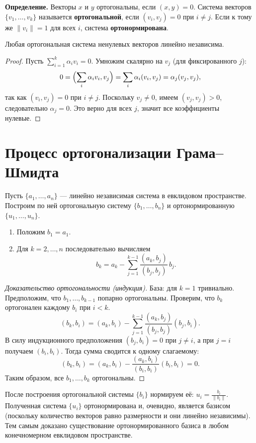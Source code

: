 \documentclass[10pt]{article}
\begin{document}
\textbf{Определение.} Векторы $x$ и $y$ ортогональны, если $(x,y)=0$. Система векторов $\{v_1,\dots,v_k\}$ называется \textbf{ортогональной}, если $(v_i, v_j)=0$ при $i\neq j$. Если к тому же $\|v_i\|=1$ для всех $i$, система \textbf{ортонормирована}.

\begin{theorem}
Любая ортогональная система ненулевых векторов линейно независима.
\end{theorem}
\begin{proof}
Пусть $\sum_{i=1}^k \alpha_i v_i = 0$. Умножим скалярно на $v_j$ (для фиксированного $j$):
\[
0 = \Bigl(\sum_i \alpha_i v_i, v_j\Bigr) = \sum_i \alpha_i (v_i, v_j) = \alpha_j (v_j, v_j),
\]
так как $(v_i, v_j)=0$ при $i\neq j$. Поскольку $v_j \neq 0$, имеем $(v_j, v_j)>0$, следовательно $\alpha_j = 0$. Это верно для всех $j$, значит все коэффициенты нулевые.
\end{proof}

\section{Процесс ортогонализации Грама–Шмидта}

Пусть $\{a_1,\dots,a_n\}$ — линейно независимая система в евклидовом пространстве. Построим по ней ортогональную систему $\{b_1,\dots,b_n\}$ и ортонормированную $\{u_1,\dots,u_n\}$.

\begin{enumerate}
  \item Положим $b_1 = a_1$.
  \item Для $k = 2,\dots,n$ последовательно вычисляем
  \[
  b_k = a_k - \sum_{j=1}^{k-1} \frac{(a_k, b_j)}{(b_j, b_j)}\, b_j.
  \]
\end{enumerate}

\begin{proof}[Доказательство ортогональности (индукция)]
База: для $k=1$ тривиально. Предположим, что $b_1,\dots,b_{k-1}$ попарно ортогональны. Проверим, что $b_k$ ортогонален каждому $b_i$ при $i<k$.
\[
(b_k, b_i) = (a_k, b_i) - \sum_{j=1}^{k-1} \frac{(a_k, b_j)}{(b_j, b_j)} (b_j, b_i).
\]
В силу индукционного предположения $(b_j, b_i)=0$ при $j\neq i$, а при $j=i$ получаем $(b_i, b_i)$. Тогда сумма сводится к одному слагаемому:
\[
(b_k, b_i) = (a_k, b_i) - \frac{(a_k, b_i)}{(b_i, b_i)}(b_i, b_i) = 0.
\]
Таким образом, все $b_1,\dots,b_k$ ортогональны.
\end{proof}

После построения ортогональной системы $\{b_i\}$ нормируем её: $u_i = \frac{b_i}{\|b_i\|}$. Полученная система $\{u_i\}$ ортонормирована и, очевидно, является базисом (поскольку количество векторов равно размерности и они линейно независимы). Тем самым доказано существование ортонормированного базиса в любом конечномерном евклидовом пространстве.
\end{document}
